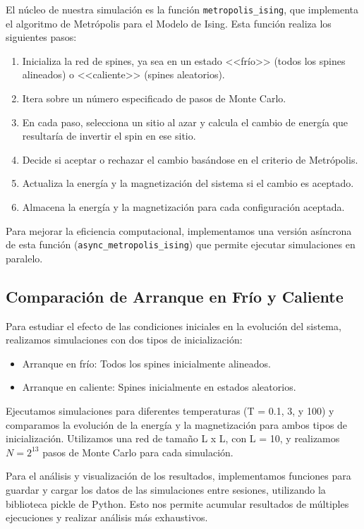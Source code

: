 \documentclass[twocolumn]{article}
\begin{document}
El núcleo de nuestra simulación es la función \texttt{metropolis\_ising}, que implementa el algoritmo de Metrópolis para el Modelo de Ising. Esta función realiza los siguientes pasos:

\begin{enumerate}
    \item Inicializa la red de spines, ya sea en un estado <<frío>> (todos los spines alineados) o <<caliente>> (spines aleatorios).
    \item Itera sobre un número especificado de pasos de Monte Carlo.
    \item En cada paso, selecciona un sitio al azar y calcula el cambio de energía que resultaría de invertir el spin en ese sitio.
    \item Decide si aceptar o rechazar el cambio basándose en el criterio de Metrópolis.
    \item Actualiza la energía y la magnetización del sistema si el cambio es aceptado.
    \item Almacena la energía y la magnetización para cada configuración aceptada.
\end{enumerate}

Para mejorar la eficiencia computacional, implementamos una versión asíncrona de esta función (\texttt{async\_metropolis\_ising}) que permite ejecutar simulaciones en paralelo.

\subsection*{Comparación de Arranque en Frío y Caliente}

Para estudiar el efecto de las condiciones iniciales en la evolución del sistema, realizamos simulaciones con dos tipos de inicialización:

\begin{itemize}
    \item Arranque en frío: Todos los spines inicialmente alineados.
    \item Arranque en caliente: Spines inicialmente en estados aleatorios.
\end{itemize}

Ejecutamos simulaciones para diferentes temperaturas (T = 0.1, 3, y 100) y comparamos la evolución de la energía y la magnetización para ambos tipos de inicialización. Utilizamos una red de tamaño L x L, con L = 10, y realizamos $N = 2^{13}$ pasos de Monte Carlo para cada simulación.

Para el análisis y visualización de los resultados, implementamos funciones para guardar y cargar los datos de las simulaciones entre sesiones, utilizando la biblioteca pickle de Python. Esto nos permite acumular resultados de múltiples ejecuciones y realizar análisis más exhaustivos.
\end{document}
